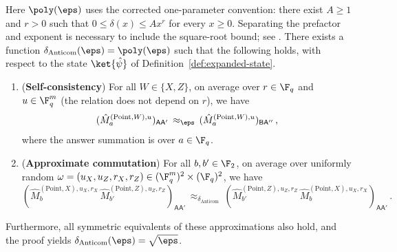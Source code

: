 \begin{lemma}
	\label{lem:qld-comm-cons}
	\leanok
	Here $\poly(\eps)$ uses the corrected one-parameter convention: there
	exist $A \geq 1$ and $r>0$ such that
	$0 \leq \delta(x) \leq A x^r$ for every $x \geq 0$. Separating the
	prefactor and exponent is necessary to include the square-root bound;
	see \cite{gap:qpbt_polynomial-error-square-root}.
	There exists a function $\delta_{\mathrm{Anticom}}(\eps) = \poly(\eps)$
	such that the following holds, with respect to the state
	$\ket{\hat{\psi}}$ of Definition~\ref{def:expanded-state}.
	\begin{enumerate}
		\item (\textbf{Self-consistency}) For all $W \in \{X,Z\}$, on
		average over $r \in \F_q$ and $u \in \F_q^m$ (the relation does not
		depend on $r$), we have
		\[
			(\hat{M}^{(\mathrm{Point},W),u}_a)_{\mathsf{A}\mathsf{A}'}
			\,\approx_\eps\,
			(\hat{M}^{(\mathrm{Point},W),u}_a)_{\mathsf{B}\mathsf{A}''}\,,
		\]
		where the answer summation is over $a \in \F_q$.
		\item (\textbf{Approximate commutation}) For all $b, b' \in \F_2$,
		on average over uniformly random
		$\omega = (u_X,u_Z,r_X,r_Z) \in (\F_q^m)^2 \times (\F_q)^2$, we
		have
		\[
			(\hat{M}^{(\mathrm{Point},X),u_X,r_X}_{b}\,
			\hat{M}^{(\mathrm{Point},Z),u_Z,r_Z}_{b'})_{\mathsf{A}\mathsf{A}'}
			\,\approx_{\delta_{\mathrm{Anticom}}}\,
			(\hat{M}^{(\mathrm{Point},Z),u_Z,r_Z}_{b'}\,
			\hat{M}^{(\mathrm{Point},X),u_X,r_X}_{b})_{\mathsf{A}\mathsf{A}'}\,.
		\]
	\end{enumerate}
	Furthermore, all symmetric equivalents of these approximations also
	hold, and the proof yields $\delta_{\mathrm{Anticom}}(\eps) = \sqrt{\eps}$.
\end{lemma}
